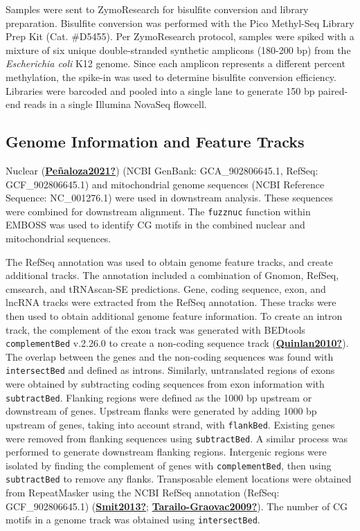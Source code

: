 \documentclass [11pt, proquest] {uwthesis}[2015/03/03]
\begin{document}
Samples were sent to ZymoResearch for bisulfite conversion and library preparation. Bisulfite conversion was performed with the Pico Methyl-Seq Library Prep Kit (Cat. \#D5455). Per ZymoResearch protocol, samples were spiked with a mixture of six unique double-stranded synthetic amplicons (180-200 bp) from the \emph{Escherichia coli} K12 genome. Since each amplicon represents a different percent methylation, the spike-in was used to determine bisulfite conversion efficiency. Libraries were barcoded and pooled into a single lane to generate 150 bp paired-end reads in a single Illumina NovaSeq flowcell.

\hypertarget{genome-information-and-feature-tracks-1}{%
\subsection{Genome Information and Feature Tracks}\label{genome-information-and-feature-tracks-1}}

Nuclear (\protect\hyperlink{ref-Peuxf1aloza2021}{\textbf{Peñaloza2021?}}) (NCBI GenBank: GCA\_902806645.1, RefSeq: GCF\_902806645.1) and mitochondrial genome sequences (NCBI Reference Sequence: NC\_001276.1) were used in downstream analysis. These sequences were combined for downstream alignment. The \texttt{fuzznuc} function within EMBOSS was used to identify CG motifs in the combined nuclear and mitochondrial sequences.

The RefSeq annotation was used to obtain genome feature tracks, and create additional tracks. The annotation included a combination of Gnomon, RefSeq, cmsearch, and tRNAscan-SE predictions. Gene, coding sequence, exon, and lncRNA tracks were extracted from the RefSeq annotation. These tracks were then used to obtain additional genome feature information. To create an intron track, the complement of the exon track was generated with BEDtools \texttt{complementBed} v.2.26.0 to create a non-coding sequence track (\protect\hyperlink{ref-Quinlan2010}{\textbf{Quinlan2010?}}). The overlap between the genes and the non-coding sequences was found with \texttt{intersectBed} and defined as introns. Similarly, untranslated regions of exons were obtained by subtracting coding sequences from exon information with \texttt{subtractBed}. Flanking regions were defined as the 1000 bp upstream or downstream of genes. Upstream flanks were generated by adding 1000 bp upstream of genes, taking into account strand, with \texttt{flankBed}. Existing genes were removed from flanking sequences using \texttt{subtractBed}. A similar process was performed to generate downstream flanking regions. Intergenic regions were isolated by finding the complement of genes with \texttt{complementBed}, then using \texttt{subtractBed} to remove any flanks. Transposable element locations were obtained from RepeatMasker using the NCBI RefSeq annotation (RefSeq: GCF\_902806645.1) (\protect\hyperlink{ref-Smit2013}{\textbf{Smit2013?}}; \protect\hyperlink{ref-Tarailo-Graovac2009}{\textbf{Tarailo-Graovac2009?}}). The number of CG motifs in a genome track was obtained using \texttt{intersectBed}.
\end{document}
